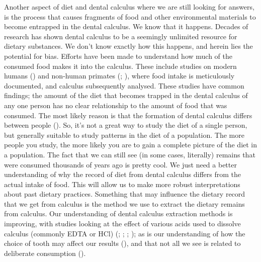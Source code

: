 \documentclass[
  b5paper,
]{book}
\begin{document}
Another aspect of diet and dental calculus where we are still looking
for answers, is the process that causes fragments of food and other
environmental materials to become entrapped in the dental calculus. We
know that it happens. Decades of research has shown dental calculus to
be a seemingly unlimited resource for dietary substances. We don't know
exactly how this happens, and herein lies the potential for bias.
Efforts have been made to understand how much of the consumed food makes
it into the calculus. These include studies on modern humans
() and
non-human primates (; ), where food intake is meticulously documented, and
calculus subsequently analysed. These studies have common findings; the
amount of the diet that becomes trapped in the dental calculus of any
one person has no clear relationship to the amount of food that was
consumed. The most likely reason is that the formation of dental
calculus differs between people
(). So,
it's not a great way to study the diet of a single person, but generally
suitable to study patterns in the diet of a population. The more people
you study, the more likely you are to gain a complete picture of the
diet in a population. The fact that we can still see (in some cases,
literally) remains that were consumed thousands of years ago is pretty
cool. We just need a better understanding of why the record of diet from
dental calculus differs from the actual intake of food. This will allow
us to make more robust interpretations about past dietary practices.
Something that may influence the dietary record that we get from
calculus is the method we use to extract the dietary remains from
calculus. Our understanding of dental calculus extraction methods is
improving, with studies looking at the effect of various acids used to
dissolve calculus (commonly EDTA or HCl)
(;
;
; ); as is
our understanding of how the choice of tooth may affect our results
(), and that not all we see is related to deliberate consumption
().
\end{document}
